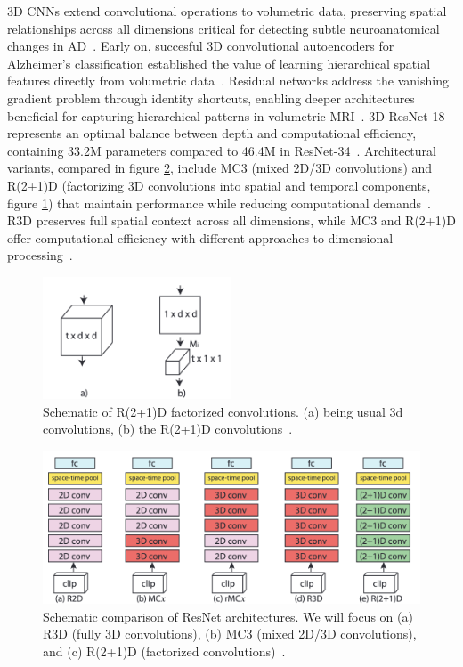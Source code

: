 \documentclass[11pt, a4paper]{article}
\begin{document}
3D CNNs extend convolutional operations to volumetric data, preserving spatial relationships across all dimensions critical for detecting subtle neuroanatomical changes in AD~\cite{ebrahimi2020introducing}. Early on, succesful 3D convolutional autoencoders for Alzheimer's classification established the value of learning hierarchical spatial features directly from volumetric data~\cite{lian2018hierarchical, payan2015predicting}. Residual networks address the vanishing gradient problem through identity shortcuts, enabling deeper architectures beneficial for capturing hierarchical patterns in volumetric MRI~\cite{wu20223d}. 3D ResNet-18 represents an optimal balance between depth and computational efficiency, containing 33.2M parameters compared to 46.4M in ResNet-34~\cite{ebrahimi2020introducing}. Architectural variants, compared in figure \ref{fig:cnn_architectures}, include MC3 (mixed 2D/3D convolutions) and R(2+1)D (factorizing 3D convolutions into spatial and temporal components, figure \ref{fig:2plus1D}) that maintain performance while reducing computational demands~\cite{wu20223d}. R3D preserves full spatial context across all dimensions, while MC3 and R(2+1)D offer computational efficiency with different approaches to dimensional processing~\cite{tran2018closer}.

\begin{figure}[htbp]
  \centering
  \includegraphics[width=0.5\textwidth]{figures/2plus1d.png}
  \caption{Schematic of R(2+1)D factorized convolutions. (a) being usual 3d convolutions, (b) the R(2+1)D convolutions~\cite{tran2018closer}.}
  \label{fig:2plus1D}
\end{figure}

\begin{figure}[htbp]
  \centering
  \includegraphics[width=\textwidth]{figures/res_net_archs.png}
  \caption{Schematic comparison of ResNet architectures. We will focus on (a) R3D (fully 3D convolutions), (b) MC3 (mixed 2D/3D convolutions), and (c) R(2+1)D (factorized convolutions)~\cite{tran2018closer}.}
  \label{fig:cnn_architectures}
\end{figure}
\end{document}
